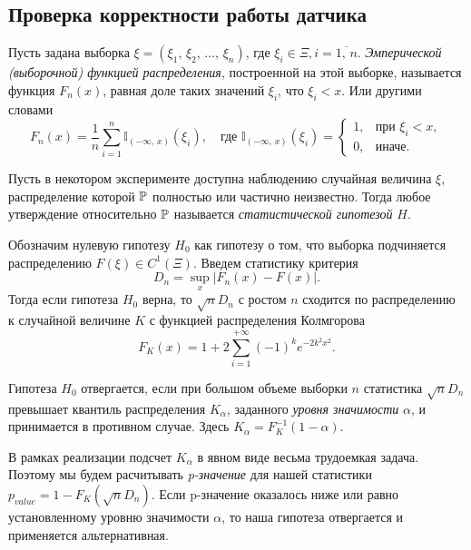\subsection{Проверка корректности работы датчика}
\begin{definition}
        Пусть задана выборка $\xi = (\xi_1,\,\xi_2,\,\ldots,\,\xi_n)$, где $\xi_i \in \Xi, i = \overline{1,\,n}$. \textit{Эмперической (выборочной) функцией распределения}, построенной на этой выборке, называется функция $F_n(x)$, равная доле таких значений $\xi_i$, что $\xi_i < x$. Или другими словами
$$
        F_n(x) = \frac{1}{n}
        \sum_{i = 1}^n \mathbb{I}_{(-\infty,\,x)}(\xi_i),
        \quad
        \mbox{где }
        \mathbb{I}_{(-\infty,\,x)}(\xi_i)
        =
        \begin{cases}
                1, & \mbox{при } \xi_i < x, \\
                0, & \mbox{иначе.}
        \end{cases}
$$
\end{definition}
\begin{definition}
        Пусть в некотором эксперименте доступна наблюдению случайная величина $\xi$, распределение которой $\mathbb{P}$ полностью или частично неизвестно. Тогда любое утверждение относительно $\mathbb{P}$ называется \textit{статистической гипотезой} $H$.
\end{definition}
\begin{theorem}
        Обозначим нулевую гипотезу $H_0$ как гипотезу о том, что выборка подчиняется распределению $F(\xi) \in C^1(\Xi)$. Введем статистику критерия
$$
        D_n = \sup\limits_{x}|F_n(x) - F(x)|.
$$
        Тогда если гипотеза $H_0$ верна, то $\sqrt{n}D_n$ с ростом $n$ сходится по распределению к случайной величине $K$ с функцией распределения Колмгорова
$$
        F_K(x) = 1 + 2\sum_{i = 1}^{+\infty} (-1)^k e^{-2k^2x^2}.
$$
\end{theorem}
\begin{remark}
        Гипотеза $H_0$ отвергается, если при большом объеме выборки $n$ статистика $\sqrt{n}D_n$ превышает квантиль распределения $K_\alpha$, заданного \textit{уровня значимости} $\alpha$, и принимается в противном случае. Здесь $K_\alpha = F_K^{-1}(1 - \alpha)$.
\end{remark}

В рамках реализации подсчет $K_\alpha$ в явном виде весьма трудоемкая задача. Поэтому мы будем расчитывать \textit{p-значение} для нашей статистики $p_{value} = 1 - F_K(\sqrt{n}D_n)$. Если p-значение оказалось ниже или равно установленному уровню значимости $\alpha$, то наша гипотеза отвергается и применяется альтернативная.

